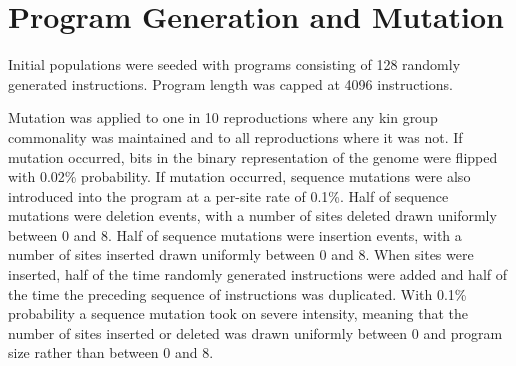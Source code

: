 \section{Program Generation and Mutation}
\label{sec:generation_mutation}

Initial populations were seeded with programs consisting of 128 randomly generated instructions.
Program length was capped at 4096 instructions.

Mutation was applied to one in 10 reproductions where any kin group commonality was maintained and to all reproductions where it was not.
If mutation occurred, bits in the binary representation of the genome were flipped with 0.02\% probability.
If mutation occurred, sequence mutations were also introduced into the program at a per-site rate of 0.1\%.
Half of sequence mutations were deletion events, with a number of sites deleted drawn uniformly between 0 and 8.
Half of sequence mutations were insertion events, with a number of sites inserted drawn uniformly between 0 and 8.
When sites were inserted, half of the time randomly generated instructions were added and half of the time the preceding sequence of instructions was duplicated.
With 0.1\% probability a sequence mutation took on severe intensity, meaning that the number of sites inserted or deleted was drawn uniformly between 0 and program size rather than between 0 and 8.
